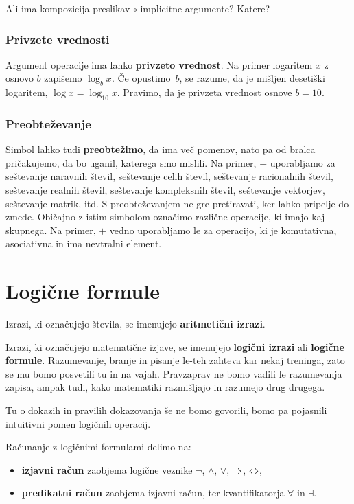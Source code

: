\begin{naloga}
  Ali ima kompozicija preslikav $\circ$ implicitne argumente? Katere?
\end{naloga}

\subsubsection{Privzete vrednosti}
\label{sec:privzete-vrednosti}

Argument operacije ima lahko \textbf{privzeto vrednost}. Na primer logaritem $x$ z osnovo $b$ zapišemo $\log_b x$. Če opustimo~$b$, se razume, da je mišljen desetiški logaritem, $\log x = \log_10 x$. Pravimo, da je privzeta vrednost osnove $b = 10$.

\subsubsection{Preobteževanje}
\label{sec:preobteevanje}

Simbol lahko tudi \textbf{preobtežimo}, da ima več pomenov, nato pa od bralca pričakujemo, da bo uganil, katerega smo
mislili. Na primer, $+$ uporabljamo za
%
seštevanje naravnih števil,
seštevanje celih števil,
seštevanje racionalnih števil,
seštevanje realnih števil,
seštevanje kompleksnih števil,
seštevanje vektorjev,
seštevanje matrik,
itd.
%
S preobteževanjem ne gre pretiravati, ker lahko pripelje do zmede. Običajno z istim simbolom označimo različne operacije, ki imajo kaj skupnega. Na primer, $+$ vedno uporabljamo le za operacijo, ki je komutativna, asociativna in ima nevtralni element.


\section{Logične formule}

Izrazi, ki označujejo števila, se imenujejo \textbf{aritmetični izrazi}.

Izrazi, ki označujejo matematične izjave, se imenujejo \textbf{logični izrazi} ali \textbf{logične formule}. Razumevanje, branje in pisanje le-teh zahteva kar nekaj treninga, zato se mu bomo posvetili tu in na vajah. Pravzaprav ne bomo vadili le razumevanja zapisa, ampak tudi, kako matematiki razmišljajo in razumejo drug drugega.

Tu o dokazih in pravilih dokazovanja še ne bomo govorili, bomo pa pojasnili intuitivni pomen logičnih operacij.

Računanje z logičnimi formulami delimo na:
%
\begin{itemize}
\item \textbf{izjavni račun} zaobjema logične veznike $\neg $, $\land$, $\lor$, $\Rightarrow$, $\Leftrightarrow$,
\item \textbf{predikatni račun} zaobjema izjavni račun, ter kvantifikatorja $\forall$ in $\exists$.
\end{itemize}


